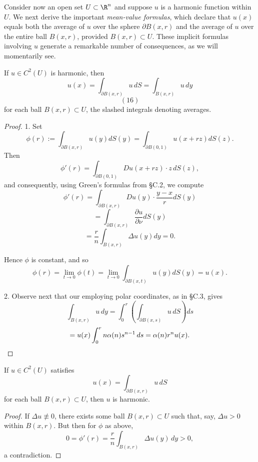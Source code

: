 Consider now an open set $U \subset \R^n$ and suppose $u$ is a harmonic function within $U$. We next derive the important \textit{mean-value formulas}, which declare that $u(x)$ equals both the average of $u$ over the sphere $\partial B(x, r)$ and the average of $u$ over the entire ball $B(x, r)$, provided $B(x, r) \subset U$. These implicit formulas involving $u$ generate a remarkable number of consequences, as we will momentarily see.

\begin{theorem}
\label{thm:mean-value-formulas-laplace}
If $u \in C^2(U)$ is harmonic, then
$$u(x) = \int_{\partial B(x,r)} u \, dS = \int_{B(x,r)} u \, dy$$
$$(16)$$
for each ball $B(x, r) \subset U$, the slashed integrals denoting averages.
\end{theorem}

\begin{proof}
1. Set
$$\phi(r) := \int_{\partial B(x,r)} u(y) dS(y) = \int_{\partial B(0,1)} u(x + rz) dS(z).$$
Then
$$\phi'(r) = \int_{\partial B(0,1)} Du(x + rz) \cdot z \, dS(z),$$
and consequently, using Green's formulas from \S C.2, we compute
$$\phi'(r) = \int_{\partial B(x,r)} Du(y) \cdot \frac{y - x}{r} dS(y)$$
$$= \int_{\partial B(x,r)} \frac{\partial u}{\partial \nu} dS(y)$$
$$= \frac{r}{n} \int_{B(x,r)} \Delta u(y) dy = 0.$$

Hence $\phi$ is constant, and so
$$\phi(r) = \lim_{t \to 0} \phi(t) = \lim_{t \to 0} \int_{\partial B(x,t)} u(y) dS(y) = u(x).$$

2. Observe next that our employing polar coordinates, as in \S C.3, gives
$$\int_{B(x,r)} u \, dy = \int_0^r \left(\int_{\partial B(x,s)} u \, dS\right) ds$$
$$= u(x) \int_0^r n\alpha(n) s^{n-1} \, ds = \alpha(n) r^n u(x). \qedhere$$
\end{proof}

\begin{theorem}
\label{thm:converse-mean-value-property-laplace}
If $u \in C^2(U)$ satisfies
$$u(x) = \int_{\partial B(x,r)} u \, dS$$
for each ball $B(x,r) \subset U$, then $u$ is harmonic.
\end{theorem}

\begin{proof}
If $\Delta u \not\equiv 0$, there exists some ball $B(x,r) \subset U$ such that, say, $\Delta u > 0$ within $B(x,r)$. But then for $\phi$ as above,
$$0 = \phi'(r) = \frac{r}{n} \int_{B(x,r)} \Delta u(y) \, dy > 0,$$
a contradiction.
\end{proof}


